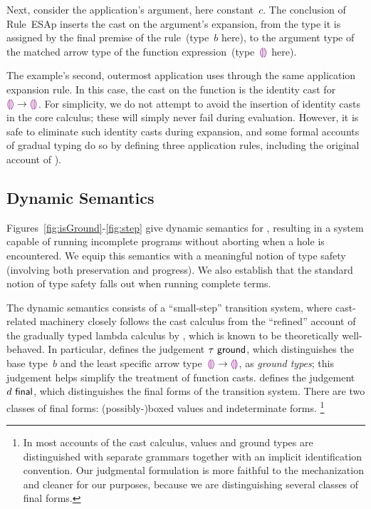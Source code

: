 Next, consider the application's argument, here constant~$c$.
%
The conclusion of Rule~{ESAp} inserts the cast on the argument's
expansion, from the type it is assigned by the final premise of the
rule~(type~$b$ here), to the argument type of the matched arrow type
of the function expression~(type~$\textcolor{violet}{\llparenthesis}\textcolor{violet}{\rrparenthesis}$ here).

The example's second, outermost application uses through the same
application expansion rule.
%
In this case, the cast on the function is the identity cast for
$\textcolor{violet}{\llparenthesis}\textcolor{violet}{\rrparenthesis} \rightarrow \textcolor{violet}{\llparenthesis}\textcolor{violet}{\rrparenthesis}$.
%
For simplicity, we do not attempt to avoid the insertion of identity
casts in the core calculus; these will simply never fail during
evaluation.
%
However, it is safe to eliminate such identity casts during expansion,
and some formal accounts of gradual typing do so by defining three
application rules, including the original account of \cite{Siek06a}).

\subsection{Dynamic Semantics}
\label{sec:evaluation}

Figures~\ref{fig:isGround}-\ref{fig:step} give dynamic semantics for \HazelnutLive,
%
resulting in a system capable of running incomplete programs without aborting when a hole is encountered.
%
We equip this semantics with a meaningful notion of type safety (involving both preservation and progress).
%
We also establish that the standard notion of type safety falls out when running complete terms.


The dynamic semantics consists of a ``small-step'' transition system,
%
where cast-related machinery closely follows the cast calculus from
the ``refined'' account of the gradually typed lambda calculus
by \citet{DBLP:conf/snapl/SiekVCB15}, which is known to be
theoretically well-behaved.
%
In particular,  defines the judgement
$\tau~\mathsf{ground}$, which distinguishes the base type~$b$ and the
least specific arrow type~$\textcolor{violet}{\llparenthesis}\textcolor{violet}{\rrparenthesis} \rightarrow \textcolor{violet}{\llparenthesis}\textcolor{violet}{\rrparenthesis}$, as \emph{ground
types}; this judgement helps simplify the treatment of function casts.
%
 defines the judgement $d~\mathsf{final}$, which
distinguishes the final forms of the transition system.
%
There are two classes of final forms: (possibly-)boxed values and
indeterminate forms.%
%
\footnote{
        In most accounts of the cast calculus, values and ground types
        are distinguished with separate grammars together with an
        implicit identification convention.
        Our judgmental formulation is more faithful to the mechanization and
        cleaner for our purposes, because we are distinguishing several
        classes of final forms.
}

